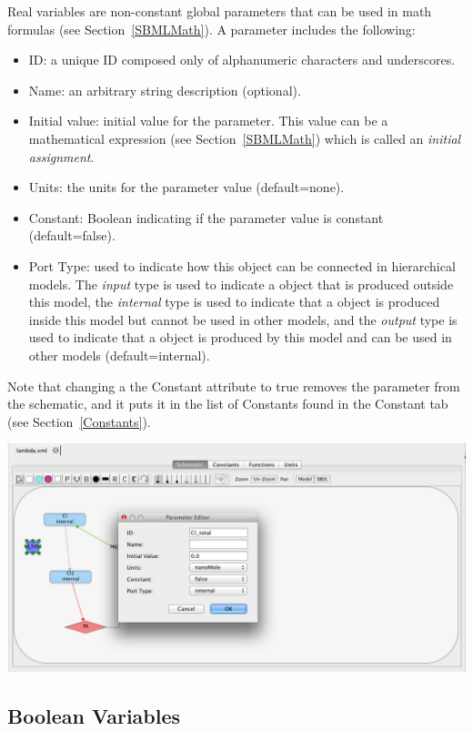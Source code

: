 \documentclass[titlepage,11pt]{article}
\begin{document}
\noindent
Real variables are non-constant global parameters that can be used in math formulas (see Section~\ref{SBMLMath}).  A parameter includes the following:
\begin{itemize}
\item ID: a unique ID composed only of alphanumeric characters and underscores.
\item Name: an arbitrary string description (optional).
\item Initial value: initial value for the parameter.  This value can be a mathematical expression (see Section~\ref{SBMLMath}) which is called an \emph{initial assignment}.
\item Units: the units for the parameter value (default=none).
\item Constant: Boolean indicating if the parameter value is constant (default=false).
\item Port Type: used to indicate how this object can be connected in hierarchical models.  The \emph{input} type is used to indicate a object that is produced outside this model, the \emph{internal} type is used to indicate that a object is produced inside this model but cannot be used in other models, and the \emph{output} type is used to indicate that a object is produced by this model and can be used in other models (default=internal). 
\end{itemize}
Note that changing a the Constant attribute to true removes the parameter from the schematic, and it puts it in the list of Constants found in the Constant tab (see Section~\ref{Constants}).

\begin{center}
\includegraphics[width=160mm]{screenshots/parameter}
\end{center}

\clearpage

\subsection{\label{Booleans}Boolean Variables}
\end{document}
